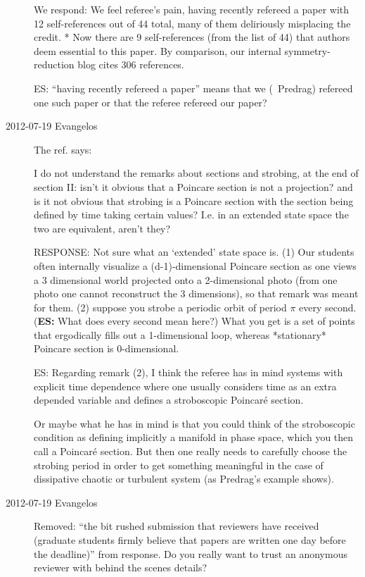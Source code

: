 \begin{description}
We respond:
We feel referee's pain, having recently refereed a paper with 12
self-references out of 44 total, many of them deliriously misplacing the
credit.
*   Now there are 9 self-references (from the list of 44) that authors
    deem essential to this paper. By comparison, our internal
    symmetry-reduction blog cites 306 references.

ES: ``having recently refereed a paper'' means that we (\ie\ Predrag) refereed one such paper or that the referee refereed our paper? 

\item[2012-07-19 Evangelos] The ref. says:

I do not understand the remarks about sections and strobing, at the end
of section II: isn't it obvious that a Poincare section is not a
projection? and is it not obvious that strobing is a Poincare section
with the section being defined by time taking certain values? I.e. in an
extended state space the two are equivalent, aren't they?

RESPONSE: Not sure what an `extended' state space is.
(1) Our students often internally visualize a (d-1)-dimensional Poincare
section as one views a 3 dimensional world projected onto a 2-dimensional
photo (from one photo one cannot reconstruct the 3 dimensions), so that
remark was meant for them.
(2) suppose you strobe a periodic orbit of period $\pi$ every second. ({\bf ES:} What does every second mean here?)
What you get is a set of points that ergodically fills out a
1-dimensional loop, whereas *stationary* Poincare section is
0-dimensional.

ES: Regarding remark (2), I think the referee has in mind systems 
with explicit time dependence where one usually considers time as an extra depended
variable and defines a stroboscopic Poincar\'e section.

Or maybe what he has in mind is that you could think of the stroboscopic condition
as defining implicitly a manifold in phase space, which you then call a
Poincar\'e section. But then one really needs to carefully choose the strobing
period in order to get something meaningful in the case of dissipative chaotic or
turbulent system (as Predrag's example shows).

\item[2012-07-19 Evangelos] Removed: ``the bit
rushed submission that reviewers have received (graduate students firmly
believe that papers are written one day before the deadline)''
from response. Do you really want to trust an anonymous reviewer with behind
the scenes details?

\end{description}

